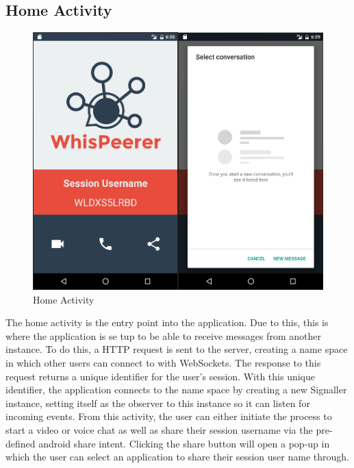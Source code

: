 \documentclass[]{report}
\begin{document}
		\subsection{Home Activity}
			\begin{figure}[H]
				\caption{Home Activity}
				\centering
				\includegraphics[scale=0.35]{HomeActivity.png}
			\end{figure}		
		The home activity is the entry point into the application. Due to this, this is where the application is se tup to be able to receive messages from another instance. To do this, a HTTP request is sent to the server, creating a name space in which other users can connect to with WebSockets. The response to this request returns a unique identifier for the user's session. With this unique identifier, the application connects to the name space by creating a new Signaller instance, setting itself as the observer to this instance so it can listen for incoming events. From this activity, the user can either initiate the process to start a video or voice chat as well as share their session username via the pre-defined android share intent. Clicking the share button will open a pop-up in which the user can select an application to share their session user name through.
		
\end{document}
